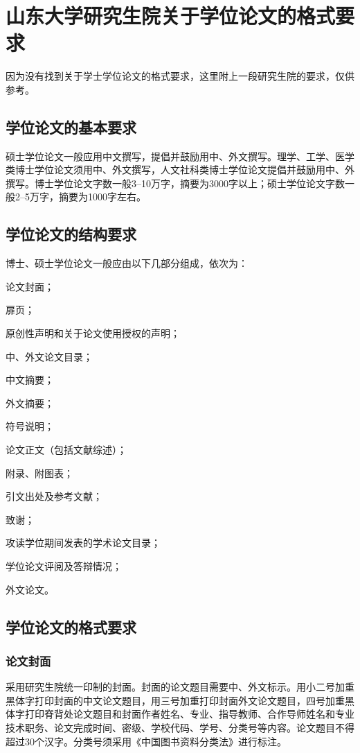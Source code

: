 \chapter{山东大学研究生院关于学位论文的格式要求}
因为没有找到关于学士学位论文的格式要求，这里附上一段研究生院的要求，仅供参考。
\section{学位论文的基本要求}
硕士学位论文一般应用中文撰写，提倡并鼓励用中、外文撰写。理学、工学、医学类博士学位论文须用中、外文撰写，人文社科类博士学位论文提倡并鼓励用中、外撰写。博士学位论文字数一般3--10万字，摘要为3000字以上；硕士学位论文字数一般2--5万字，摘要为1000字左右。
\section{学位论文的结构要求}
博士、硕士学位论文一般应由以下几部分组成，依次为：
\begin{inparaenum}
\item 论文封面；\item 扉页；\item 原创性声明和关于论文使用授权的声明；\item 中、外文论文目录；\item 中文摘要；\item 外文摘要；\item 符号说明；\item 论文正文（包括文献综述）；\item 附录、附图表；\item 引文出处及参考文献；\item 致谢；\item 攻读学位期间发表的学术论文目录；\item 学位论文评阅及答辩情况；\item 外文论文。
\end{inparaenum}
\section{学位论文的格式要求}
\subsection{论文封面}
采用研究生院统一印制的封面。封面的论文题目需要中、外文标示。用小二号加重黑体字打印封面的中文论文题目，用三号加重打印封面外文论文题目，四号加重黑体字打印脊背处论文题目和封面作者姓名、专业、指导教师、合作导师姓名和专业技术职务、论文完成时间、密级、学校代码、学号、分类号等内容。论文题目不得超过30个汉字。分类号须采用《中国图书资料分类法》进行标注。
